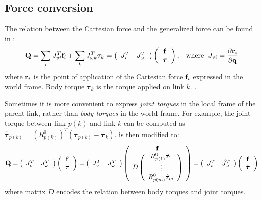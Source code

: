 \subsection{Force conversion}
The relation between the Cartesian force and the generalized force can
be found in :
\begin{equation}
\label{eq:force_conversion}
\mathbf{Q} = \sum_i J_{vi}^T \mathbf{f}_i + \sum_k J_{\omega k}^T \bm{\tau}_k = 
\left (
\begin{array}{cc}
J_{v}^T & J_\omega^T
\end{array}
\right)
\left(
\begin{array}{c}
\mathbf{f} \\
\bm{\tau}
\end{array}
\right) 
, \;\;\;\mathrm{where}\;\;
J_{vi} = \frac{\partial \mathbf{r}_i}{\partial \mathbf{q}}
\end{equation}
where $\mathbf{r}_i$ is the point of application of the Cartesian force
$\mathbf{f}_i$ expressed in the world frame. Body torque $\bm{\tau}_k$ is the torque
applied on link $k$. .

Sometimes it is more convenient to express \emph{joint torques} in the
local frame of the parent link, rather than \emph{body torques} in the
world frame. For example, the joint torque between link $p(k)$ and
link $k$ can be computed as $\hat{\bm{\tau}}_{p(k)} = (R^0_{p(k)})^T(\bm{\tau}_{p(k)} -
\bm{\tau}_k)$.  is then modified to:
\begin{equation}
\mathbf{Q} = \left (
\begin{array}{cc}
J_{v}^T & J_\omega^T
\end{array}
\right )
\left (
\begin{array}{c}
\mathbf{f} \\
\bm{\tau}
\end{array}
\right ) 
 = \left (
\begin{array}{cc}
J_{v}^T & J_\omega^T
\end{array}
\right )
\left (
\begin{array}{c}
\mathbf{f} \\
D 
\left (
\begin{array}{c}
R^0_{p(1)} \hat{\bm{\tau}}_1 \\
\vdots \\
R^0_{p(m)} \hat{\bm{\tau}}_m
\end{array}
\right )
\end{array}
\right ) =
\left (
\begin{array}{cc}
J_{v}^T & \hat{J}_\omega^T
\end{array}
\right )
\left (
\begin{array}{c}
\mathbf{f} \\
\hat{\bm{\tau}}
\end{array}
\right )  
\end{equation}
where matrix $D$ encodes the relation between body torques and joint
torques. 


